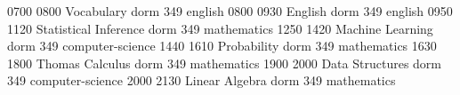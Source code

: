 \documentclass[a4paper,10pt]{report}
\begin{document}
\begin{landscape}
\begin{timetable}
   {0700} {0800}   {Vocabulary}                 {}      {dorm 349}      {english}
   {0800} {0930}   {English}                    {}      {dorm 349}      {english}
   {0950} {1120}   {Statistical Inference}      {}      {dorm 349}      {mathematics}
   {1250} {1420}   {Machine Learning}           {}      {dorm 349}      {computer-science}
   {1440} {1610}   {Probability}                {}      {dorm 349}      {mathematics}
   {1630} {1800}   {Thomas Calculus}            {}      {dorm 349}      {mathematics}
   {1900} {2000}   {Data Structures}            {}      {dorm 349}      {computer-science}
   {2000} {2130}   {Linear Algebra}             {}      {dorm 349}      {mathematics}

\end{timetable}
\end{landscape}
\end{document}
